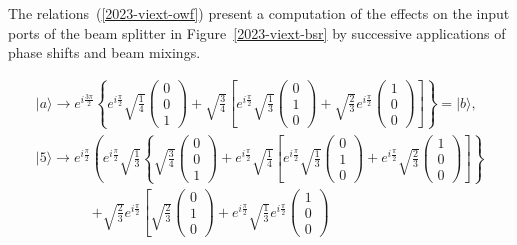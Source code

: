 \documentclass[%
 superscriptaddress,
  preprint,
 showpacs,
 showkeys,
 nofootinbib,
  amsmath,amssymb,
  aps,
 pra,
  longbibliography,
  floatfix,
 ]{revtex4-2}
\theoremstyle{definition}
\begin{document}
The relations~(\ref{2023-viext-owf}) present a computation of the effects on the input ports of the beam splitter
in Figure~\ref{2023-viext-bsr} by successive applications of phase shifts and beam mixings.
\begin{widetext}
\begin{equation}
\begin{split}
\vert a \rangle
\longrightarrow
e^{i\frac{3\pi}{2}} \left\{
 e^{i\frac{\pi}{2}} \sqrt{\frac14}  \begin{pmatrix}0\\0\\1\end{pmatrix} +   \sqrt{\frac34}  \left[  e^{i\frac{\pi}{2}}  \sqrt{\frac13}  \begin{pmatrix}0\\1\\0\end{pmatrix} +    \sqrt{\frac23}    e^{i\frac{\pi}{2}} \begin{pmatrix}1\\0\\0\end{pmatrix} \right]
\right\} =  \vert b \rangle
,
\\
\vert 5 \rangle
\longrightarrow
 e^{i\frac{\pi}{2}} \left(
 e^{i\frac{\pi}{2}}  \sqrt{\frac13} \left\{
 \sqrt{\frac34}   \begin{pmatrix}0\\0\\1\end{pmatrix} +  e^{i\frac{\pi}{2}}  \sqrt{\frac14} \left[
                                            e^{i\frac{\pi}{2}}  \sqrt{\frac13}  \begin{pmatrix}0\\1\\0\end{pmatrix} +  e^{i\frac{\pi}{2}}  \sqrt{\frac23}  \begin{pmatrix}1\\0\\0\end{pmatrix}
                                           \right]
                      \right\}  \right.
\\ \qquad \qquad
\left.
+  \sqrt{\frac23}   e^{i\frac{\pi}{2}}  \left[   \sqrt{\frac23}  \begin{pmatrix}0\\1\\0\end{pmatrix} +  e^{i\frac{\pi}{2}}  \sqrt{\frac13}   e^{i\frac{\pi}{2}} \begin{pmatrix}1\\0\\0\end{pmatrix}

\end{split}
\end{equation}
\end{widetext}
\end{document}
